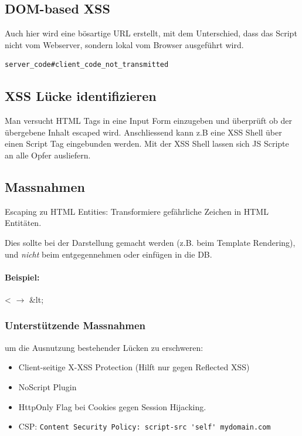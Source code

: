 \subsection{DOM-based XSS}
Auch hier wird eine bösartige URL erstellt, mit dem Unterschied, dass das Script nicht vom Webserver, sondern lokal vom Browser ausgeführt wird. 

\begin{lstlisting}
server_code#client_code_not_transmitted
\end{lstlisting}

\subsection{XSS Lücke identifizieren}
Man versucht HTML Tags in eine Input Form einzugeben und überprüft ob der übergebene Inhalt escaped wird. Anschliessend kann z.B eine XSS Shell über einen Script Tag eingebunden werden. Mit der XSS Shell lassen sich JS Scripte an alle Opfer ausliefern.

\subsection{Massnahmen}
Escaping zu HTML Entities: Transformiere gefährliche Zeichen in HTML Entitäten.

Dies sollte bei der Darstellung gemacht werden (z.B. beim Template Rendering), und \emph{nicht} beim entgegennehmen oder einfügen in die DB.

\paragraph{Beispiel:}
< $\rightarrow$ \&lt;


\subsubsection{Unterstützende Massnahmen}

um die Ausnutzung bestehender Lücken zu erschweren:

\begin{itemize}
	\item Client-seitige X-XSS Protection (Hilft nur gegen Reflected XSS)
	\item NoScript Plugin
	\item HttpOnly Flag bei Cookies gegen Session Hijacking.
	\item CSP: \lstinline|Content Security Policy: script-src 'self' mydomain.com|
\end{itemize}

